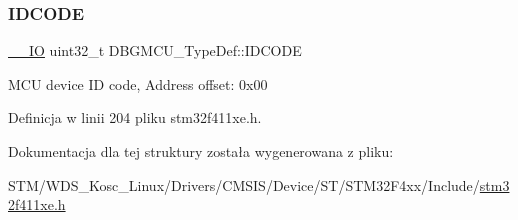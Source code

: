 \subsubsection{\texorpdfstring{I\+D\+C\+O\+DE}{IDCODE}}
{\footnotesize\ttfamily \hyperlink{core__sc300_8h_aec43007d9998a0a0e01faede4133d6be}{\+\_\+\+\_\+\+IO} uint32\+\_\+t D\+B\+G\+M\+C\+U\+\_\+\+Type\+Def\+::\+I\+D\+C\+O\+DE}

M\+CU device ID code, Address offset\+: 0x00 

Definicja w linii 204 pliku stm32f411xe.\+h.



Dokumentacja dla tej struktury została wygenerowana z pliku\+:\begin{DoxyCompactItemize}
\item 
S\+T\+M/\+W\+D\+S\+\_\+\+Kosc\+\_\+\+Linux/\+Drivers/\+C\+M\+S\+I\+S/\+Device/\+S\+T/\+S\+T\+M32\+F4xx/\+Include/\hyperlink{stm32f411xe_8h}{stm32f411xe.\+h}\end{DoxyCompactItemize}

